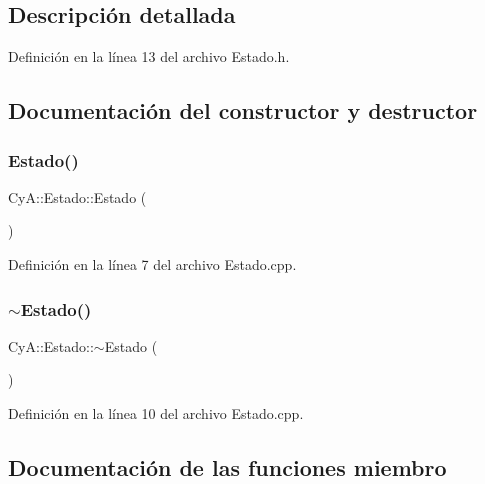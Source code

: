 \subsection{Descripción detallada}


Definición en la línea 13 del archivo Estado.\+h.



\subsection{Documentación del constructor y destructor}
\mbox{\label{class_cy_a_1_1_estado_a3f2fc56adbfa985981d70e6b6f7a175a}} 
\subsubsection{\texorpdfstring{Estado()}{Estado()}}
{\footnotesize\ttfamily Cy\+A\+::\+Estado\+::\+Estado (\begin{DoxyParamCaption}{ }\end{DoxyParamCaption})}



Definición en la línea 7 del archivo Estado.\+cpp.

\mbox{\label{class_cy_a_1_1_estado_af9482bdfe735f4862e444c4e63b81c84}} 
\subsubsection{\texorpdfstring{$\sim$\+Estado()}{~Estado()}}
{\footnotesize\ttfamily Cy\+A\+::\+Estado\+::$\sim$\+Estado (\begin{DoxyParamCaption}{ }\end{DoxyParamCaption})\hspace{0.3cm}{\ttfamily [virtual]}}



Definición en la línea 10 del archivo Estado.\+cpp.



\subsection{Documentación de las funciones miembro}
\mbox{\label{class_cy_a_1_1_estado_a7ada3a4e88d3c27d66592eef790fdf46}} 
